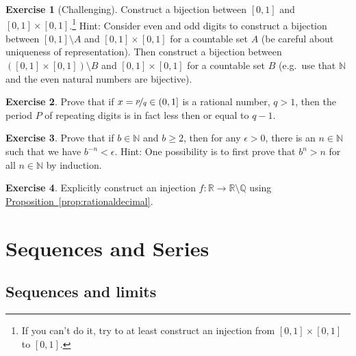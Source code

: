 \documentclass[12pt]{book}
\newcommand{\R}{{\mathbb{R}}}
\newcommand{\N}{{\mathbb{N}}}
\newcommand{\Q}{{\mathbb{Q}}}
\theoremstyle{plain}
\theoremstyle{remark}
\theoremstyle{definition}
\theoremstyle{exercise}
\newtheorem{exercise}{Exercise}[section]
\theoremstyle{example}
\newcommand{\propref}[1]{\hyperref[#1]{Proposition~\ref*{#1}}}
\begin{document}
\begin{exercise}[Challenging]
Construct a bijection between $[0,1]$ and $[0,1] \times [0,1]$.\footnote{%
If you can't do it, try to at least construct an injection from
$[0,1] \times [0,1]$ to
$[0,1]$.}
Hint:
Consider even and odd digits to construct a bijection between 
$[0,1] \setminus A$ and $[0,1] \times [0,1]$ for a countable set $A$ (be
careful about uniqueness of representation).
Then construct a bijection between $([0,1] \times [0,1]) \setminus B$
and $[0,1] \times [0,1]$ for a countable set $B$ (e.g.\ use 
that $\N$ and the even natural numbers are bijective).
\end{exercise}

\begin{exercise}
Prove that if $x = \nicefrac{p}{q} \in (0,1]$ is a rational number, $q > 1$,
then the period $P$ of repeating digits is in fact less then or equal to $q-1$.
\end{exercise}

\begin{exercise} \label{exercise:bnlimit}
Prove that if $b \in \N$ and $b \geq 2$, then for any $\epsilon > 0$,
there is an $n \in \N$ such that 
we have $b^{-n} < \epsilon$.  Hint:
One possibility is to first prove that $b^n > n$ for all $n \in \N$ by induction.
\end{exercise}

\begin{exercise}
Explicitly construct an injection $f \colon \R \to \R \setminus \Q$ using
\propref{prop:rationaldecimal}.
\end{exercise}



\chapter{Sequences and Series} \label{seq:chapter}


\section{Sequences and limits}
\label{sec:seqsandlims}
\end{document}
